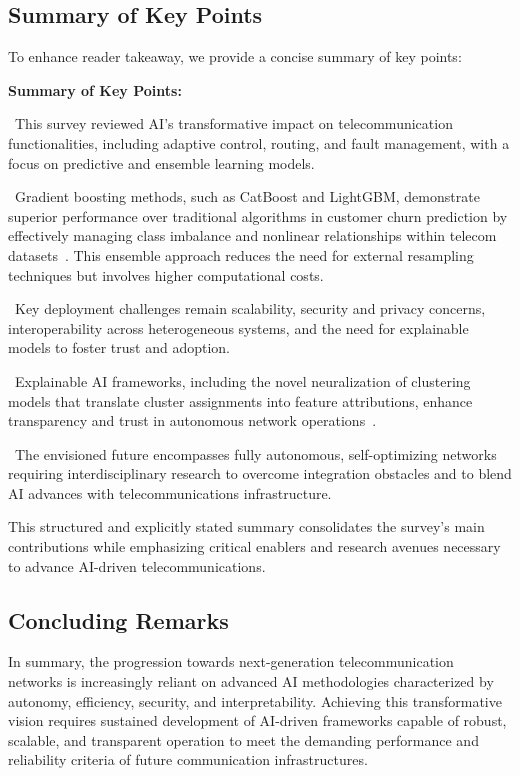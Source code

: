 \documentclass[sigconf]{acmart}
\begin{document}
\subsection{Summary of Key Points}

To enhance reader takeaway, we provide a concise summary of key points:

\textbf{Summary of Key Points:}

\textbullet\ This survey reviewed AI’s transformative impact on telecommunication functionalities, including adaptive control, routing, and fault management, with a focus on predictive and ensemble learning models.

\textbullet\ Gradient boosting methods, such as CatBoost and LightGBM, demonstrate superior performance over traditional algorithms in customer churn prediction by effectively managing class imbalance and nonlinear relationships within telecom datasets~\cite{ref17}. This ensemble approach reduces the need for external resampling techniques but involves higher computational costs.

\textbullet\ Key deployment challenges remain scalability, security and privacy concerns, interoperability across heterogeneous systems, and the need for explainable models to foster trust and adoption.

\textbullet\ Explainable AI frameworks, including the novel neuralization of clustering models that translate cluster assignments into feature attributions, enhance transparency and trust in autonomous network operations~\cite{ref45}.

\textbullet\ The envisioned future encompasses fully autonomous, self-optimizing networks requiring interdisciplinary research to overcome integration obstacles and to blend AI advances with telecommunications infrastructure.

This structured and explicitly stated summary consolidates the survey's main contributions while emphasizing critical enablers and research avenues necessary to advance AI-driven telecommunications.

\subsection{Concluding Remarks}

In summary, the progression towards next-generation telecommunication networks is increasingly reliant on advanced AI methodologies characterized by autonomy, efficiency, security, and interpretability. Achieving this transformative vision requires sustained development of AI-driven frameworks capable of robust, scalable, and transparent operation to meet the demanding performance and reliability criteria of future communication infrastructures.



\end{document}
